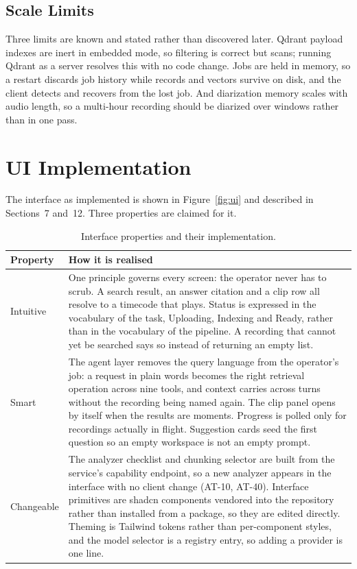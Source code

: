 \documentclass[11pt,a4paper]{article}
\begin{document}
\subsection{Scale Limits}

Three limits are known and stated rather than discovered later. Qdrant payload
indexes are inert in embedded mode, so filtering is correct but scans; running
Qdrant as a server resolves this with no code change. Jobs are held in memory, so
a restart discards job history while records and vectors survive on disk, and the
client detects and recovers from the lost job. And diarization memory scales with
audio length, so a multi-hour recording should be diarized over windows rather
than in one pass.

\section{UI Implementation}

The interface as implemented is shown in Figure~\ref{fig:ui} and described in
Sections~7 and~12. Three properties are claimed for it.

\begin{table}[htbp]
\centering
\small
\begin{tabularx}{\textwidth}{@{}L{2.2cm}X@{}}
\toprule
\textbf{Property} & \textbf{How it is realised} \\
\midrule
Intuitive & One principle governs every screen: the operator never has to scrub. A search result, an answer citation and a clip row all resolve to a timecode that plays. Status is expressed in the vocabulary of the task, Uploading, Indexing and Ready, rather than in the vocabulary of the pipeline. A recording that cannot yet be searched says so instead of returning an empty list. \\
Smart & The agent layer removes the query language from the operator's job: a request in plain words becomes the right retrieval operation across nine tools, and context carries across turns without the recording being named again. The clip panel opens by itself when the results are moments. Progress is polled only for recordings actually in flight. Suggestion cards seed the first question so an empty workspace is not an empty prompt. \\
Changeable & The analyzer checklist and chunking selector are built from the service's capability endpoint, so a new analyzer appears in the interface with no client change (AT-10, AT-40). Interface primitives are shadcn components vendored into the repository rather than installed from a package, so they are edited directly. Theming is Tailwind tokens rather than per-component styles, and the model selector is a registry entry, so adding a provider is one line. \\
\bottomrule
\end{tabularx}
\caption{Interface properties and their implementation.}
\end{table}
\end{document}
